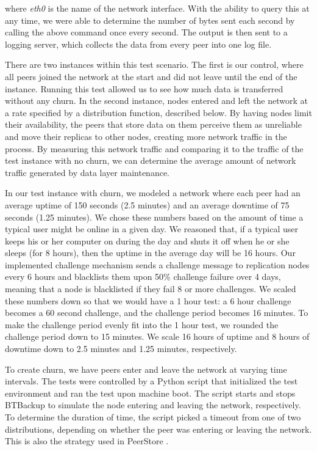 \documentclass[12pt]{report}
\begin{document}
where \textit{eth0} is the name of the network interface. With the ability to query this at any time, we were able to determine the number of bytes sent each second by calling the above command once every second. The output is then sent to a logging server, which collects the data from every peer into one log file.

There are two instances within this test scenario. The first is our control, where all peers joined the network at the start and did not leave until the end of the instance. Running this test allowed us to see how much data is transferred without any churn. In the second instance, nodes entered and left the network at a rate specified by a distribution function, described below. By having nodes limit their availability, the peers that store data on them perceive them as unreliable and move their replicas to other nodes, creating more network traffic in the process. By measuring this network traffic and comparing it to the traffic of the test instance with no churn, we can determine the average amount of network traffic generated by data layer maintenance.

In our test instance with churn, we modeled a network where each peer had an average uptime of 150 seconds (2.5 minutes) and an average downtime of 75 seconds (1.25 minutes). We chose these numbers based on the amount of time a typical user might be online in a given day. We reasoned that, if a typical user keeps his or her computer on during the day and shuts it off when he or she sleeps (for 8 hours), then the uptime in the average day will be 16 hours. Our implemented challenge mechanism sends a challenge message to replication nodes every 6 hours and blacklists them upon 50\% challenge failure over 4 days, meaning that a node is blacklisted if they fail 8 or more challenges. We scaled these numbers down so that we would have a 1 hour test: a 6 hour challenge becomes a 60 second challenge, and the challenge period becomes 16 minutes. To make the challenge period evenly fit into the 1 hour test, we rounded the challenge period down to 15 minutes. We scale 16 hours of uptime and 8 hours of downtime down to 2.5 minutes and 1.25 minutes, respectively.

To create churn, we have peers enter and leave the network at varying time intervals. The tests were controlled by a Python script that initialized the test environment and ran the test upon machine boot. The script starts and stops BTBackup to simulate the node entering and leaving the network, respectively. To determine the duration of time, the script picked a timeout from one of two distributions, depending on whether the peer was entering or leaving the network.  This is also the strategy used in PeerStore \cite{PeerStore}.
\end{document}
